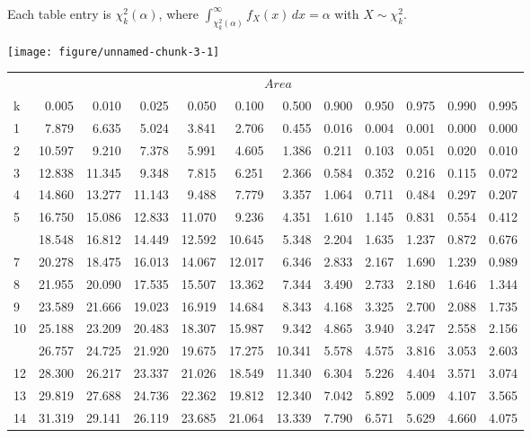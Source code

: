 \documentclass[
]{article}
\begin{document}
Each table entry is \(\chi^2_k(\alpha)\), where
\(\int_{\chi^2_k(\alpha)}^{\infty}f_X(x) \, dx = \alpha\) with
\(X\sim\chi^2_k\).

\begin{center}\texttt{[image: figure/unnamed-chunk-3-1]} \end{center}

\begin{longtable}[t]{lrrrrrrrrrrr}
\toprule
\multicolumn{1}{c}{ } & \multicolumn{11}{c}{$Area$} \\
\cmidrule(l{3pt}r{3pt}){2-12}
k & 0.005 & 0.010 & 0.025 & 0.050 & 0.100 & 0.500 & 0.900 & 0.950 & 0.975 & 0.990 & 0.995\\
\midrule
1 & 7.879 & 6.635 & 5.024 & 3.841 & 2.706 & 0.455 & 0.016 & 0.004 & 0.001 & 0.000 & 0.000\\
2 & 10.597 & 9.210 & 7.378 & 5.991 & 4.605 & 1.386 & 0.211 & 0.103 & 0.051 & 0.020 & 0.010\\
3 & 12.838 & 11.345 & 9.348 & 7.815 & 6.251 & 2.366 & 0.584 & 0.352 & 0.216 & 0.115 & 0.072\\
4 & 14.860 & 13.277 & 11.143 & 9.488 & 7.779 & 3.357 & 1.064 & 0.711 & 0.484 & 0.297 & 0.207\\
5 & 16.750 & 15.086 & 12.833 & 11.070 & 9.236 & 4.351 & 1.610 & 1.145 & 0.831 & 0.554 & 0.412\\
\addlinespace
6 & 18.548 & 16.812 & 14.449 & 12.592 & 10.645 & 5.348 & 2.204 & 1.635 & 1.237 & 0.872 & 0.676\\
7 & 20.278 & 18.475 & 16.013 & 14.067 & 12.017 & 6.346 & 2.833 & 2.167 & 1.690 & 1.239 & 0.989\\
8 & 21.955 & 20.090 & 17.535 & 15.507 & 13.362 & 7.344 & 3.490 & 2.733 & 2.180 & 1.646 & 1.344\\
9 & 23.589 & 21.666 & 19.023 & 16.919 & 14.684 & 8.343 & 4.168 & 3.325 & 2.700 & 2.088 & 1.735\\
10 & 25.188 & 23.209 & 20.483 & 18.307 & 15.987 & 9.342 & 4.865 & 3.940 & 3.247 & 2.558 & 2.156\\
\addlinespace
11 & 26.757 & 24.725 & 21.920 & 19.675 & 17.275 & 10.341 & 5.578 & 4.575 & 3.816 & 3.053 & 2.603\\
12 & 28.300 & 26.217 & 23.337 & 21.026 & 18.549 & 11.340 & 6.304 & 5.226 & 4.404 & 3.571 & 3.074\\
13 & 29.819 & 27.688 & 24.736 & 22.362 & 19.812 & 12.340 & 7.042 & 5.892 & 5.009 & 4.107 & 3.565\\
14 & 31.319 & 29.141 & 26.119 & 23.685 & 21.064 & 13.339 & 7.790 & 6.571 & 5.629 & 4.660 & 4.075\\

\end{longtable}
\end{document}
